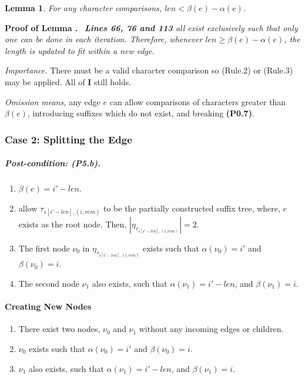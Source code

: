 \documentclass{article}
\newtheorem{lemma}{Lemma}[section]
\newenvironment{proof}{\par\noindent\textbf{Proof of Lemma \thelemma.}\ \itshape}{\par}
\begin{document}
	\begin{lemma}
		For any character comparisons, $len < \beta(e) - \alpha(e)$.
	\end{lemma}
	\begin{proof}
		\textbf{Lines 66, 76 and 113} all exist exclusively such that only one can be done in each iteration.  Therefore, whenever $len \ge \beta(e) - \alpha(e)$, the length is updated to fit within a new edge.
	\end{proof}
	\textit{Importance.} There must be a valid character comparison so (Rule.2) or (Rule.3) may be applied.  All of \textbf{I} still holds.

	\textit{Omission means,} any edge $e$ can allow comparisons of characters greater than $\beta(e)$, introducing suffixes which do not exist, and breaking \textbf{(P0.7)}.
	
	\subsubsection{Case 2: Splitting the Edge}
	\subparagraph{Post-condition: (P5.b).} 
	\begin{enumerate}[label=(P5.b.\arabic*), ref=(P3.a.\arabic*)]
		\item $\beta(e) = i\prime - len$.
		\item allow $\tau_{s[i\prime - len], (i, rem)}$ to be the partially constructed suffix tree, where, $e$ exists as the root node.  Then, $|\eta_{\tau_{s[i\prime - len], (i, rem)}}| = 2$.
		\item The first node $\nu_0$ in $\eta_{\tau_{s[i\prime - len], (i, rem)}}$ exists such that $\alpha(\nu_0) = i\prime$ and $\beta(\nu_0) = i$.
		\item The second node $\nu_1$ also exists, such that $\alpha(\nu_1) = i\prime - len$, and $\beta(\nu_1) = i$.
	\end{enumerate}
	
	\paragraph{Creating New Nodes}
	\begin{enumerate}[label=(P5.b.\arabic*), ref=(P3.a.\arabic*)]
		\item There exist two nodes, $\nu_0$ and $\nu_1$ without any incoming edges or children.
		\item $\nu_0$ exists such that $\alpha(\nu_0) = i\prime$ and $\beta(\nu_0) = i$.
		\item $\nu_1$ also exists, such that $\alpha(\nu_1) = i\prime - len$, and $\beta(\nu_1) = i$.
	\end{enumerate}
	
\end{document}
